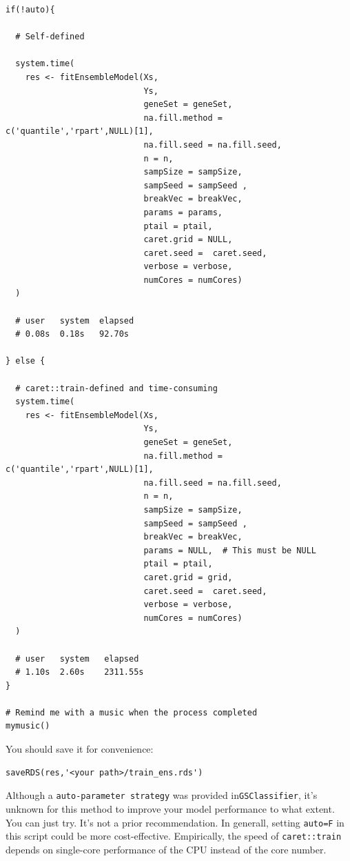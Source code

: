 \documentclass[
  12pt,
]{book}
\newcommand{\passthrough}[1]{#1}
\begin{document}
\begin{lstlisting}
if(!auto){
  
  # Self-defined
  
  system.time(
    res <- fitEnsembleModel(Xs,
                            Ys,
                            geneSet = geneSet,
                            na.fill.method = c('quantile','rpart',NULL)[1],
                            na.fill.seed = na.fill.seed,
                            n = n,
                            sampSize = sampSize,
                            sampSeed = sampSeed ,
                            breakVec = breakVec,
                            params = params,
                            ptail = ptail,
                            caret.grid = NULL,
                            caret.seed =  caret.seed,
                            verbose = verbose,
                            numCores = numCores)
  )
  
  # user   system  elapsed
  # 0.08s  0.18s   92.70s
  
} else {
  
  # caret::train-defined and time-consuming
  system.time(
    res <- fitEnsembleModel(Xs,
                            Ys,
                            geneSet = geneSet,
                            na.fill.method = c('quantile','rpart',NULL)[1],
                            na.fill.seed = na.fill.seed,
                            n = n,
                            sampSize = sampSize,
                            sampSeed = sampSeed ,
                            breakVec = breakVec,
                            params = NULL,  # This must be NULL
                            ptail = ptail,
                            caret.grid = grid,
                            caret.seed =  caret.seed,
                            verbose = verbose,
                            numCores = numCores)
  )
  
  # user   system   elapsed
  # 1.10s  2.60s    2311.55s
}

# Remind me with a music when the process completed
mymusic() 
\end{lstlisting}

You should save it for convenience:

\begin{lstlisting}
saveRDS(res,'<your path>/train_ens.rds')
\end{lstlisting}

Although a \passthrough{\lstinline!auto-parameter strategy!} was provided in\passthrough{\lstinline!GSClassifier!}, it's unknown for this method to improve your model performance to what extent. You can just try. It's not a prior recommendation. In generall, setting \passthrough{\lstinline!auto=F!} in this script could be more cost-effective. Empirically, the speed of \passthrough{\lstinline!caret::train!} depends on single-core performance of the CPU instead of the core number.
\end{document}
